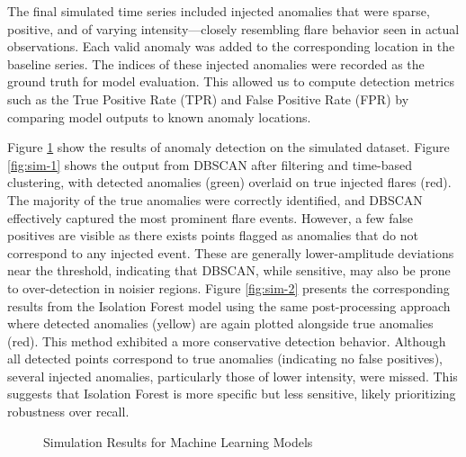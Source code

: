 \documentclass[
]{article}
\begin{document}
The final simulated time series included injected anomalies that were sparse, positive, and of varying intensity---closely resembling flare behavior seen in actual observations. Each valid anomaly was added to the corresponding location in the baseline series. The indices of these injected anomalies were recorded as the ground truth for model evaluation. This allowed us to compute detection metrics such as the True Positive Rate (TPR) and False Positive Rate (FPR) by comparing model outputs to known anomaly locations.

Figure \ref{fig:sim} show the results of anomaly detection on the simulated dataset. Figure \ref{fig:sim-1} shows the output from DBSCAN after filtering and time-based clustering, with detected anomalies (green) overlaid on true injected flares (red). The majority of the true anomalies were correctly identified, and DBSCAN effectively captured the most prominent flare events. However, a few false positives are visible as there exists points flagged as anomalies that do not correspond to any injected event. These are generally lower-amplitude deviations near the threshold, indicating that DBSCAN, while sensitive, may also be prone to over-detection in noisier regions. Figure \ref{fig:sim-2} presents the corresponding results from the Isolation Forest model using the same post-processing approach where detected anomalies (yellow) are again plotted alongside true anomalies (red). This method exhibited a more conservative detection behavior. Although all detected points correspond to true anomalies (indicating no false positives), several injected anomalies, particularly those of lower intensity, were missed. This suggests that Isolation Forest is more specific but less sensitive, likely prioritizing robustness over recall.

\begin{figure}[H]

{\centering {}

}

\caption{Simulation Results for Machine Learning Models}\label{fig:sim}
\end{figure}
\end{document}
